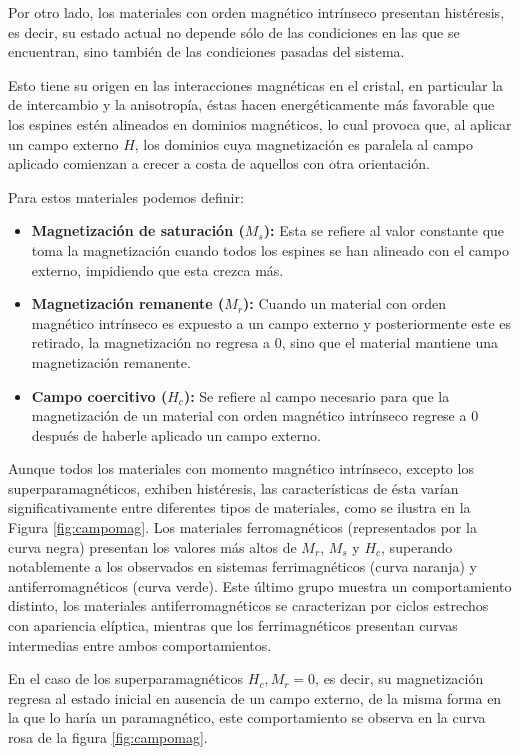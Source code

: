 \documentclass[../main.tex]{subfiles}
\begin{document}
Por otro lado, los materiales con orden magnético intrínseco presentan histéresis, es decir, su estado actual no depende sólo de las condiciones en las que se encuentran, sino también de las condiciones pasadas del sistema.

Esto tiene su origen en las interacciones magnéticas en el cristal, en particular la de intercambio y la anisotropía, éstas hacen energéticamente más favorable que los espines estén alineados en dominios magnéticos, lo cual provoca que, al aplicar un campo externo $H$, los dominios cuya magnetización es paralela al campo aplicado comienzan a crecer a costa de aquellos con otra orientación.

Para estos materiales podemos definir:
\begin{itemize}
    \item \textbf{Magnetización de saturación ($M_s$):} Esta se refiere al valor constante que toma la magnetización cuando todos los espines se han alineado con el campo externo, impidiendo que esta crezca más.
    \item \textbf{Magnetización remanente ($M_r$):} Cuando un material con orden magnético intrínseco es expuesto a un campo externo y posteriormente este es retirado, la magnetización no regresa a 0, sino que el material mantiene una magnetización remanente.
    \item \textbf{Campo coercitivo ($H_c$):} Se refiere al campo necesario para que la magnetización de un material con orden magnético intrínseco regrese a 0 después de haberle aplicado un campo externo.
\end{itemize}
Aunque todos los materiales con momento magnético intrínseco, excepto los superparamagnéticos, exhiben histéresis, las características de ésta varían significativamente entre diferentes tipos de materiales, como se ilustra en la Figura \ref{fig:campomag}. Los materiales ferromagnéticos (representados por la curva negra) presentan los valores más altos de $M_r$, $M_s$ y $H_c$, superando notablemente a los observados en sistemas ferrimagnéticos (curva naranja) y antiferromagnéticos (curva verde). Este último grupo muestra un comportamiento distinto, los materiales antiferromagnéticos se caracterizan por ciclos estrechos con apariencia elíptica, mientras que los ferrimagnéticos presentan curvas intermedias entre ambos comportamientos.

En el caso de los superparamagnéticos $H_c,M_r=0$, es decir, su magnetización regresa al estado inicial en ausencia de un campo externo, de la misma forma en la que lo haría un paramagnético, este comportamiento se observa en la curva rosa de la figura \ref{fig:campomag}.
\end{document}
